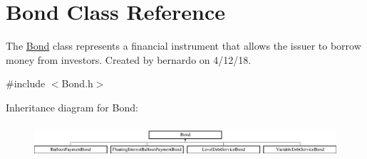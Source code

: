 \hypertarget{classBond}{}\section{Bond Class Reference}
\label{classBond}


The {\ttfamily \mbox{\hyperlink{classBond}{Bond}}} class represents a financial instrument that allows the issuer to borrow money from investors. Created by bernardo on 4/12/18.  




{\ttfamily \#include $<$Bond.\+h$>$}

Inheritance diagram for Bond\+:\begin{figure}[H]
\begin{center}
\leavevmode
\includegraphics[height=1.244444cm]{classBond}
\end{center}
\end{figure}
